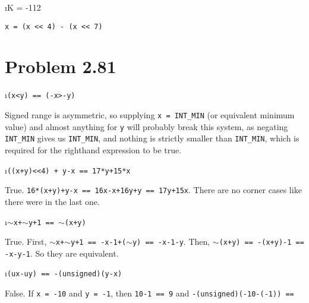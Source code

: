 \documentclass[fleqn]{article}
\begin{document}
\i K = -112

 \begin{solution}
   \texttt{x = (x << 4) - (x << 7)}
 \end{solution}

\ene

\section*{Problem 2.81}

\bee
\i \texttt{(x<y) == (-x>-y)}

 \begin{solution}
   Signed range is asymmetric, so supplying \texttt{x = INT\_MIN} (or equivalent minimum value) and almost anything for \texttt{y} will probably break this system, as negating \texttt{INT\_MIN} gives us \texttt{INT\_MIN}, and nothing is strictly smaller than \texttt{INT\_MIN}, which is required for the righthand expression to be true.
 \end{solution}

\i \texttt{((x+y)<<4) + y-x == 17*y+15*x}

 \begin{solution}
   True. \texttt{16*(x+y)+y-x == 16x-x+16y+y == 17y+15x}. There are no corner cases like there were in the last one.
 \end{solution}

\i \texttt{$\sim$x+$\sim$y+1 == $\sim$(x+y)}

 \begin{solution}
   True. First, \texttt{$\sim$x+$\sim$y+1 == -x-1+($\sim$y) == -x-1-y}. Then, \texttt{$\sim$(x+y) == -(x+y)-1 == -x-y-1}. So they are equivalent. 
 \end{solution}

\i \texttt{(ux-uy) == -(unsigned)(y-x)}

 \begin{solution}
   False. If \texttt{x = -10} and \texttt{y = -1}, then \texttt{10-1 == 9} and \texttt{-(unsigned)(-10-(-1)) == }
 \end{solution}
 
\end{document}
